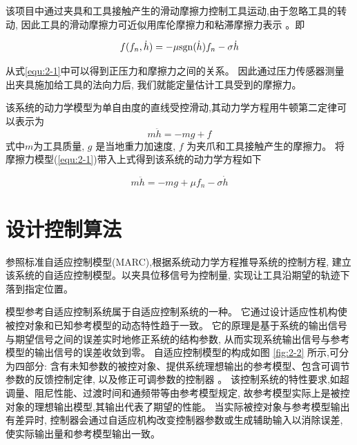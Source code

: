 该项目中通过夹具和工具接触产生的滑动摩擦力控制工具运动,由于忽略工具的转动,
因此工具的滑动摩擦力可近似用库伦摩擦力和粘滞摩擦力表示 \cite{ref9}。即

\begin{equation}
  f({f_n},\dot h) =  - \mu {\mathop{\rm sgn}} (\dot h){f_n} - \sigma \dot h
  \label{equ:2-1}
\end{equation}

\begin{note}
\end{note}

从式\ref{equ:2-1}中可以得到正压力和摩擦力之间的关系。
因此通过压力传感器测量出夹具施加给工具的法向力后,
我们就能定量估计工具受到的摩擦力。

该系统的动力学模型为单自由度的直线受控滑动,其动力学方程用牛顿第二定律可以表示为
\begin{equation}
  m\ddot h =  - mg + f
  \label{equ:2-2}
\end{equation}
\noindent 式中$m$为工具质量, $g$ 是当地重力加速度, $f$ 为夹爪和工具接触产生的摩擦力。
将摩擦力模型(\ref{equ:2-1})带入上式得到该系统的动力学方程如下

\begin{equation}
  m\ddot h =  - mg + \mu {f_n} - \sigma \dot h
  \label{equ:2-3}
\end{equation}


\section{设计控制算法}
参照标准自适应控制模型(MARC),根据系统动力学方程推导系统的控制方程,
建立该系统的自适应控制模型。以夹具位移信号为控制量,
实现让工具沿期望的轨迹下落到指定位置。

模型参考自适应控制系统属于自适应控制系统的一种。
它通过设计适应性机构使被控对象和已知参考模型的动态特性趋于一致。
它的原理是基于系统的输出信号与期望信号之间的误差实时地修正系统的结构参数,
从而实现系统输出信号与参考模型的输出信号的误差收敛到零。
自适应控制模型的构成如图 \ref{fig:2-2} 所示,可分为四部分:
含有未知参数的被控对象、提供系统理想输出的参考模型、包含可调节参数的反馈控制定律,
以及修正可调参数的控制器 \cite{ref10} 。
该控制系统的特性要求,如超调量、阻尼性能、过渡时间和通频带等由参考模型规定,
故参考模型实际上是被控对象的理想输出模型,其输出代表了期望的性能。
当实际被控对象与参考模型输出有差异时,
控制器会通过自适应机构改变控制器参数或生成辅助输入以消除误差,
使实际输出量和参考模型输出一致。

